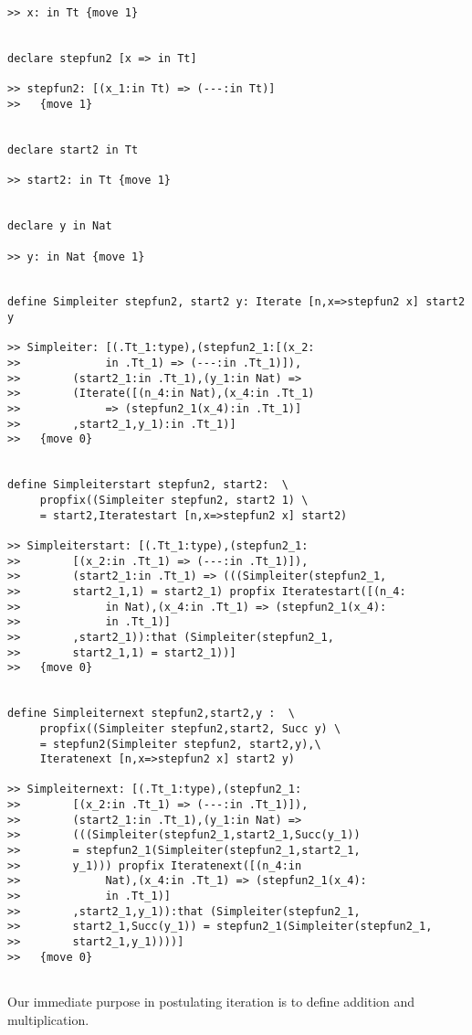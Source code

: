 \documentclass[12pt]{article}
\begin{document}
\begin{verbatim}
>> x: in Tt {move 1}


declare stepfun2 [x => in Tt]

>> stepfun2: [(x_1:in Tt) => (---:in Tt)]
>>   {move 1}


declare start2 in Tt

>> start2: in Tt {move 1}


declare y in Nat

>> y: in Nat {move 1}


define Simpleiter stepfun2, start2 y: Iterate [n,x=>stepfun2 x] start2 y

>> Simpleiter: [(.Tt_1:type),(stepfun2_1:[(x_2:
>>             in .Tt_1) => (---:in .Tt_1)]),
>>        (start2_1:in .Tt_1),(y_1:in Nat) => 
>>        (Iterate([(n_4:in Nat),(x_4:in .Tt_1) 
>>             => (stepfun2_1(x_4):in .Tt_1)]
>>        ,start2_1,y_1):in .Tt_1)]
>>   {move 0}


define Simpleiterstart stepfun2, start2:  \
     propfix((Simpleiter stepfun2, start2 1) \
     = start2,Iteratestart [n,x=>stepfun2 x] start2)

>> Simpleiterstart: [(.Tt_1:type),(stepfun2_1:
>>        [(x_2:in .Tt_1) => (---:in .Tt_1)]),
>>        (start2_1:in .Tt_1) => (((Simpleiter(stepfun2_1,
>>        start2_1,1) = start2_1) propfix Iteratestart([(n_4:
>>             in Nat),(x_4:in .Tt_1) => (stepfun2_1(x_4):
>>             in .Tt_1)]
>>        ,start2_1)):that (Simpleiter(stepfun2_1,
>>        start2_1,1) = start2_1))]
>>   {move 0}


define Simpleiternext stepfun2,start2,y :  \
     propfix((Simpleiter stepfun2,start2, Succ y) \
     = stepfun2(Simpleiter stepfun2, start2,y),\
     Iteratenext [n,x=>stepfun2 x] start2 y)

>> Simpleiternext: [(.Tt_1:type),(stepfun2_1:
>>        [(x_2:in .Tt_1) => (---:in .Tt_1)]),
>>        (start2_1:in .Tt_1),(y_1:in Nat) => 
>>        (((Simpleiter(stepfun2_1,start2_1,Succ(y_1)) 
>>        = stepfun2_1(Simpleiter(stepfun2_1,start2_1,
>>        y_1))) propfix Iteratenext([(n_4:in 
>>             Nat),(x_4:in .Tt_1) => (stepfun2_1(x_4):
>>             in .Tt_1)]
>>        ,start2_1,y_1)):that (Simpleiter(stepfun2_1,
>>        start2_1,Succ(y_1)) = stepfun2_1(Simpleiter(stepfun2_1,
>>        start2_1,y_1))))]
>>   {move 0}


\end{verbatim}

Our immediate purpose in postulating iteration is to define addition and multiplication.
\end{document}
